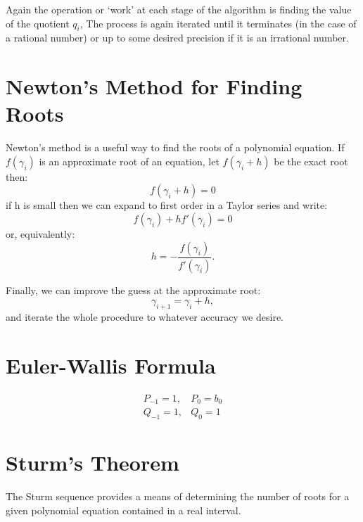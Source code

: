 Again the operation or `work' at each stage of the algorithm
is finding the value of the quotient $q_i$, The process
is again iterated until it terminates (in the case of a rational number)
or up to some desired precision if it is an irrational number.


\section{Newton's Method for Finding Roots}
Newton's method is a useful way to find the roots of a polynomial
equation. If $f(\gamma_i)$ is an approximate root of an equation,
let $f(\gamma_i+h)$ be the exact root then:
%
\begin{equation}
f(\gamma_i+h)=0
\end{equation}
%
if h is small then we can expand to first order in a 
Taylor series and write:
\begin{equation}
f(\gamma_i) + h f'(\gamma_{i})= 0
\end{equation}
%
or, equivalently:
%
\begin{equation}
h = -\frac{f(\gamma_{i})}{f'(\gamma_i)}.
\end{equation}

Finally, we can improve the guess at the approximate root:
%
\begin{equation}
\gamma_{i+1} =  \gamma_{i} + h,
\end{equation}
%
and iterate the whole procedure to whatever accuracy we desire.

\section{Euler-Wallis Formula}

\begin{align}
P_{-1} = 1, & P_{0}= b_{0} \\
Q_{-1} = 1, & Q_{0}= 1 
\end{align}

\section{Sturm's Theorem}
The Sturm sequence provides a means of determining the number of 
roots for a given polynomial equation contained in a real interval.

